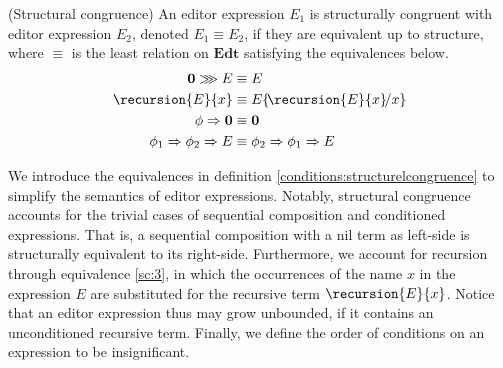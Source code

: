 \begin{definition}{(Structural congruence)}\label{conditions:structurelcongruence}
An editor expression $E_1$ is structurally congruent with editor expression $E_2$, denoted $E_1 \equiv E_2$, if they are equivalent up to structure, where $\equiv$ is the least relation on $\mathbf{Edt}$ satisfying the equivalences below.
\begin{align}
    \mathbf{0} \ggg E &\equiv E\label{sc:1}\\
    \recursion{E}{x} &\equiv E\!\left\{\!\recursion{E}{x}\!/x\right\}\label{sc:3}\\
    \phi \Rightarrow \mathbf{0} &\equiv \mathbf{0}\label{sc:4}\\
    \phi_1 \Rightarrow \phi_2 \Rightarrow E &\equiv \phi_2 \Rightarrow \phi_1 \Rightarrow E\label{sc:5}
\end{align}
\end{definition}
We introduce the equivalences in definition \ref{conditions:structurelcongruence} to simplify the semantics of editor expressions. Notably, structural congruence accounts for the trivial cases of sequential composition and conditioned expressions. That is, a sequential composition with a nil term as left-side is structurally equivalent to its right-side. Furthermore, we account for recursion through equivalence \ref{sc:3}, in which the occurrences of the name $x$ in the expression $E$ are substituted for the recursive term $\recursion{E}{x}$. Notice that an editor expression thus may grow unbounded, if it contains an unconditioned recursive term. Finally, we define the order of conditions on an expression to be insignificant.

%